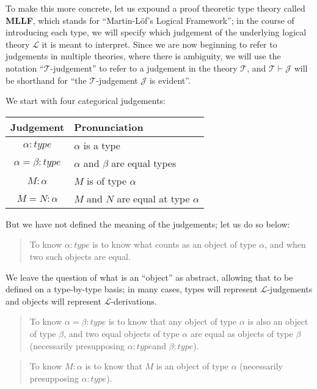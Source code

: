\documentclass{amsart}
\theoremstyle{definition}
\theoremstyle{remark}
\numberwithin{equation}{section}
\newcommand\MLLF{\textbf{MLLF}}
\newcommand\type[1]{\ensuremath{#1:\mathit{type}}}
\begin{document}
To make this more concrete, let us expound a proof theoretic type theory called
\MLLF, which stands for ``Martin-L\"of's Logical Framework''; in the course of
introducing each type, we will specify which judgement of the underlying
logical theory $\mathcal{L}$ it is meant to interpret. Since we are now
beginning to refer to judgements in multiple theories, where there is
ambiguity, we will use the notation ``$\mathcal{T}$-judgement'' to refer to a
judgement in the theory $\mathcal{T}$, and $\mathcal{T}\vdash\mathcal{J}$ will
be shorthand for ``the $\mathcal{T}$-judgement $\mathcal{J}$ is evident''.

We start with four categorical judgements:\\

\begin{tabular}{c|l}
Judgement & Pronunciation \\ \hline
  \type{\alpha} & $\alpha$ is a type \\
  \type{\alpha=\beta} & $\alpha$ and $\beta$ are equal types \\
  $M:\alpha$ & $M$ is of type $\alpha$ \\
  $M=N:\alpha$ & $M$ and $N$ are equal at type $\alpha$ \\
\end{tabular}

But we have not defined the meaning of the judgements; let us do so below:

\begin{quote}
  To know $\type\alpha$ is to know what counts as an object of type $\alpha$,
  and when two such objects are equal.
\end{quote}

We leave the question of what is an ``object'' as abstract, allowing that to be
defined on a type-by-type basis; in many cases, types will represent
$\mathcal{L}$-judgements and objects will represent $\mathcal{L}$-derivations.

\begin{quote}
  To know $\type{\alpha=\beta}$ is to know that any object of type $\alpha$ is
  also an object of type $\beta$, and two equal objects of type $\alpha$ are
  equal as objects of type $\beta$ (necessarily presupposing \type\alpha and
  \type\beta).
\end{quote}

\begin{quote}
  To know $M:\alpha$ is to know that $M$ is an object of type $\alpha$
  (necessarily presupposing \type\alpha).
\end{quote}
\end{document}
